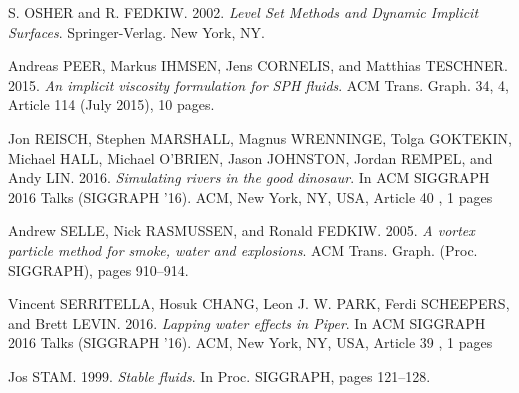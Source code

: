 \documentclass[11pt]{article}
\begin{document}
\begin{thebibliography}{2}
S. OSHER and R. FEDKIW. 2002.
\textit{Level Set Methods and Dynamic Implicit Surfaces}.
Springer-Verlag. New York, NY.

Andreas PEER, Markus IHMSEN, Jens CORNELIS, and Matthias TESCHNER. 2015.
\textit{An implicit viscosity formulation for SPH fluids}.
ACM Trans. Graph. 34, 4, Article 114 (July 2015), 10 pages.

Jon REISCH, Stephen MARSHALL, Magnus WRENNINGE, Tolga GOKTEKIN, Michael HALL, Michael O'BRIEN, Jason JOHNSTON, Jordan REMPEL, and Andy LIN. 2016.
\textit{ Simulating rivers in the good dinosaur}.
 In ACM SIGGRAPH 2016 Talks (SIGGRAPH '16). ACM, New York, NY, USA, Article 40 , 1 pages

Andrew SELLE, Nick RASMUSSEN, and Ronald FEDKIW. 2005.
\textit{A vortex particle method for smoke, water and explosions}.
ACM Trans. Graph. (Proc. SIGGRAPH), pages 910–914.

Vincent SERRITELLA, Hosuk CHANG, Leon J. W. PARK, Ferdi SCHEEPERS, and Brett LEVIN. 2016.
\textit{Lapping water effects in Piper}.
In ACM SIGGRAPH 2016 Talks (SIGGRAPH '16). ACM, New York, NY, USA, Article 39 , 1 pages

Jos STAM. 1999.
\textit{Stable fluids}.
In Proc. SIGGRAPH, pages 121–128.

\end{thebibliography}
\end{document}

